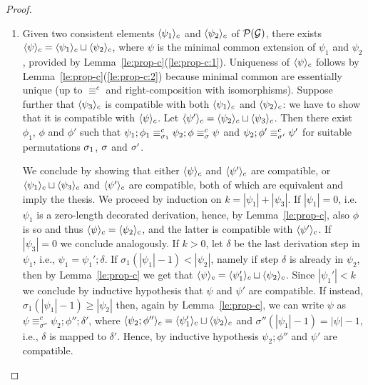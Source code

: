 \begin{proof}
\begin{enumerate}
    
  \item Given two consistent elements $\langle {\psi_1}\rangle_c$ and
    $\langle {\psi_2}\rangle_c$ of $\mathcal{P}({\mathcal{G}})$, there exists
    $\langle {\psi}\rangle_c = \langle {\psi_1}\rangle_c \sqcup \langle {\psi_2}\rangle_c$, where
    $\psi$ is the minimal common extension of $\psi_1$ and $\psi_2$,
    provided by Lemma~\ref{le:prop-c}(\ref{le:prop-c:1}). Uniqueness
    of $\langle {\psi}\rangle_c$ follows by
    Lemma~\ref{le:prop-c}(\ref{le:prop-c:2})
    because minimal common are essentially unique (up to $\equiv^c$
    and right-composition with isomorphisms).  Suppose further that
    $\langle {\psi_3}\rangle_c$ is compatible with both $\langle {\psi_1}\rangle_c$ and
    $\langle {\psi_2}\rangle_c$: we have to show that it is compatible with
    $\langle {\psi}\rangle_c$.  Let
    $\langle {\psi'}\rangle_c = \langle {\psi_2}\rangle_c \sqcup \langle {\psi_3}\rangle_c$. Then
    there exist $\phi_1$, $\phi$ and $\phi'$ such that
    $\psi_1 ; \phi_1 \equiv^c_{\sigma_1} \psi_2 ; \phi \equiv^c_{\sigma}
    \psi$ and $\psi_2 ; \phi' \equiv^c_{\sigma'} \psi'$ for suitable
    permutations $\sigma_1$, $\sigma$ and $\sigma'$.
    
    We conclude by showing that either $\langle {\psi}\rangle_c$ and $\langle {\psi'}\rangle_c$ 
    are compatible, or $\langle {\psi_1}\rangle_c \sqcup  \langle {\psi_3}\rangle_c$ and $\langle {\psi'}\rangle_c$
    are compatible, both of which are equivalent and imply the thesis. We proceed by 
    induction on $k = |\psi_1|+|\psi_3|$.  If
    $|\psi_1|=0$, i.e.~$\psi_1$ is a zero-length decorated derivation, hence,
    by Lemma~\ref{le:prop-c}, also $\phi$ is so and thus
    $\langle {\psi}\rangle_c = \langle {\psi_2}\rangle_c$, and the latter is compatible
    with $\langle {\psi'}\rangle_c$. If $|\psi_3|=0$ we conclude analogously.  
    If $k>0$, let $\delta$ be the last
     derivation step in $\psi_1$, i.e.,
    $\psi_1 = \psi_1'; \delta$. If $\sigma_1(|\psi_1|-1) < |\psi_2|$,
    namely if step $\delta$ is already in $\psi_2$, then by
    Lemma~\ref{le:prop-c} we get that
    $\langle {\psi}\rangle_c = \langle {\psi_1'}\rangle_c \sqcup \langle {\psi_2}\rangle_c$. Since
    $|\psi_1'| < k$ we conclude by inductive hypothesis
    that $\psi$ and $\psi'$ are compatible. If instead,
    $\sigma_1(|\psi_1|-1) \geq |\psi_2|$ then, again by Lemma~\ref{le:prop-c},
    we can write $\psi$ as
    $\psi \equiv^c_{\sigma''} \psi_2; \phi''; \delta'$, where
    $\langle {\psi_2; \phi''}\rangle_c = \langle {\psi_1'}\rangle_c \sqcup
    \langle {\psi_2}\rangle_c$ and $\sigma''(|\psi_1|-1) = |\psi|-1$, i.e., $\delta$
    is mapped to $\delta'$. Hence, by inductive hypothesis
    $\psi_2; \phi''$ and $\psi'$ are compatible.
    

\end{enumerate}
\end{proof}
